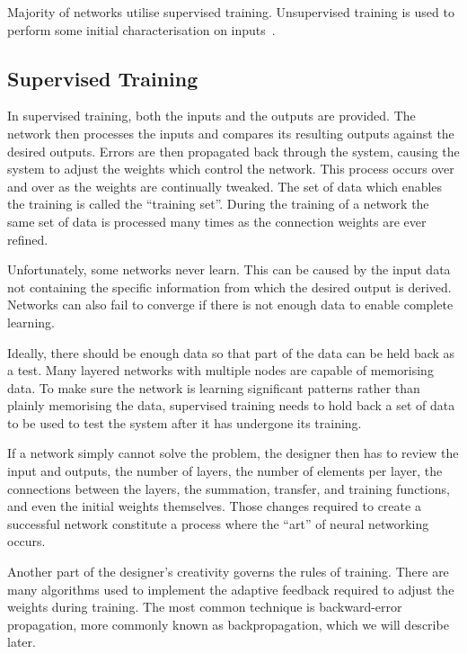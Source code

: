 Majority of networks utilise supervised training. Unsupervised training is used to perform some initial characterisation on inputs~\cite{mostcommon}.

\vspace{10pt}

\subsection*{Supervised Training}

In supervised training, both the inputs and the outputs are provided. The network then processes the inputs and compares its resulting outputs against the desired outputs. Errors are then propagated back through the system, causing the system to adjust the weights which control the network. This process occurs over and over as the weights are continually tweaked. The set of data which enables the training is called the ``training set''. During the training of a network the same set of data is processed many times as the connection weights are ever refined.

Unfortunately, some networks never learn. This can be caused by the input data not containing the specific information from which the desired output is derived. Networks can also fail to converge if there is not enough data to enable complete learning. 

Ideally, there should be enough data so that part of the data can be held back as a test. Many layered networks with multiple nodes are capable of memorising data. To make sure the network is learning significant patterns rather than plainly memorising the data, supervised training needs to hold back a set of data to be used to test the system after it has undergone its training.

If a network simply cannot solve the problem, the designer then has to review the input and outputs, the number of layers, the number of elements per layer, the connections between the layers, the summation, transfer, and training functions, and even the initial weights themselves. Those changes required to create a successful network constitute a process where the ``art'' of neural networking occurs.

Another part of the designer's creativity governs the rules of training. There are many algorithms used to implement the adaptive feedback required to adjust the weights during training. The most common technique is backward-error propagation, more commonly known as backpropagation, which we will describe later.


